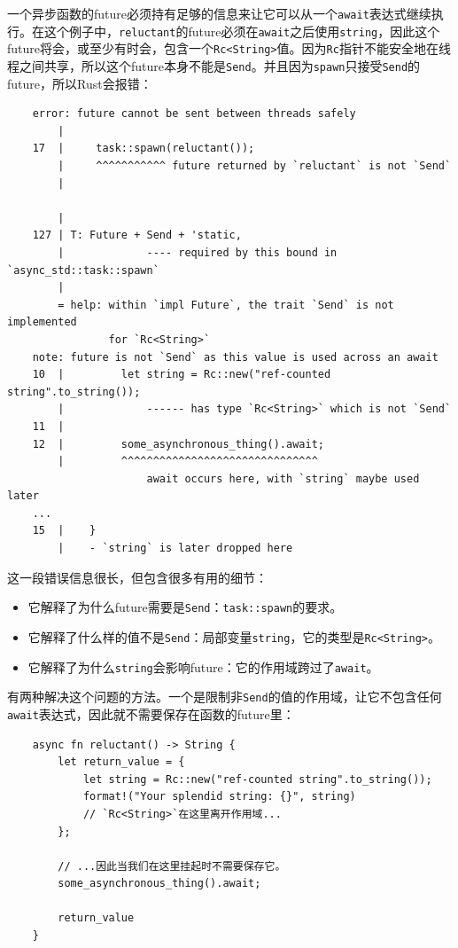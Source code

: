 一个异步函数的future必须持有足够的信息来让它可以从一个\texttt{await}表达式继续执行。在这个例子中，\texttt{reluctant}的future必须在\texttt{await}之后使用\texttt{string}，因此这个future将会，或至少有时会，包含一个\texttt{Rc<String>}值。因为\texttt{Rc}指针不能安全地在线程之间共享，所以这个future本身不能是\texttt{Send}。并且因为\texttt{spawn}只接受\texttt{Send}的future，所以Rust会报错：
\begin{verbatim}
    error: future cannot be sent between threads safely
        |
    17  |     task::spawn(reluctant());
        |     ^^^^^^^^^^^ future returned by `reluctant` is not `Send`
        |

        |
    127 | T: Future + Send + 'static,
        |             ---- required by this bound in `async_std::task::spawn`
        |
        = help: within `impl Future`, the trait `Send` is not implemented
                for `Rc<String>`
    note: future is not `Send` as this value is used across an await
    10  |         let string = Rc::new("ref-counted string".to_string());
        |             ------ has type `Rc<String>` which is not `Send`
    11  |
    12  |         some_asynchronous_thing().await;
        |         ^^^^^^^^^^^^^^^^^^^^^^^^^^^^^^^
                      await occurs here, with `string` maybe used later
    ...
    15  |    }
        |    - `string` is later dropped here
\end{verbatim}

这一段错误信息很长，但包含很多有用的细节：
\begin{itemize}
    \item 它解释了为什么future需要是\texttt{Send}：\texttt{task::spawn}的要求。
    \item 它解释了什么样的值不是\texttt{Send}：局部变量\texttt{string}，它的类型是\texttt{Rc<String>}。
    \item 它解释了为什么\texttt{string}会影响future：它的作用域跨过了\texttt{await}。
\end{itemize}

有两种解决这个问题的方法。一个是限制非\texttt{Send}的值的作用域，让它不包含任何\texttt{await}表达式，因此就不需要保存在函数的future里：
\begin{verbatim}
    async fn reluctant() -> String {
        let return_value = {
            let string = Rc::new("ref-counted string".to_string());
            format!("Your splendid string: {}", string)
            // `Rc<String>`在这里离开作用域...
        };

        // ...因此当我们在这里挂起时不需要保存它。
        some_asynchronous_thing().await;

        return_value
    }
\end{verbatim}

